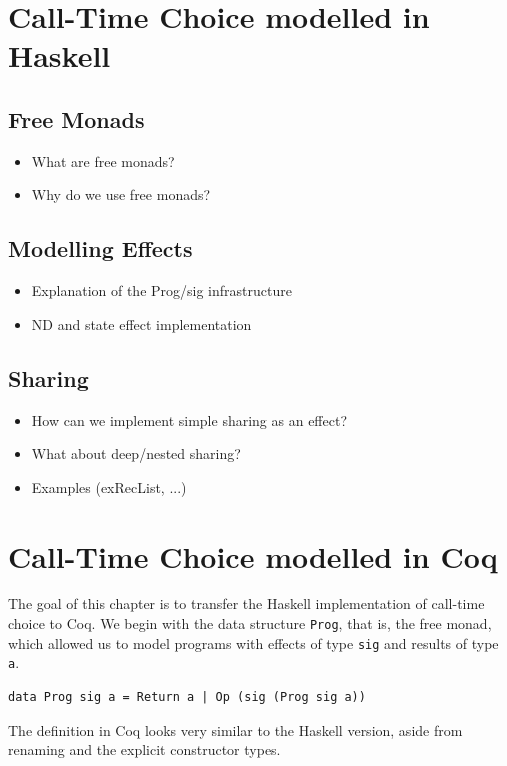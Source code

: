 \documentclass[a4paper, 11pt, fleqn, twoside]{scrreprt}
\begin{document}
\chapter{Call-Time Choice modelled in Haskell}

\section{Free Monads}
\begin{itemize}
\item What are free monads?
\item Why do we use free monads?
\end{itemize}

\section{Modelling Effects}
\begin{itemize}
\item Explanation of the Prog/sig infrastructure
\item ND and state effect implementation 
\end{itemize}

\section{Sharing}
\begin{itemize}
\item How can we implement simple sharing as an effect?
\item What about deep/nested sharing?
\item Examples (exRecList, ...)
\end{itemize}


\chapter{Call-Time Choice modelled in Coq}
The goal of this chapter is to transfer the Haskell implementation of call-time 
choice to Coq. We begin with the data structure \texttt{Prog}, 
that is, the free monad, which allowed us to model programs with effects of 
type \texttt{sig} and results of type \texttt{a}.

\begin{verbatim}
data Prog sig a = Return a | Op (sig (Prog sig a))
\end{verbatim}

The definition in Coq looks very similar to the Haskell version, aside from 
renaming and the explicit constructor types.
\end{document}
